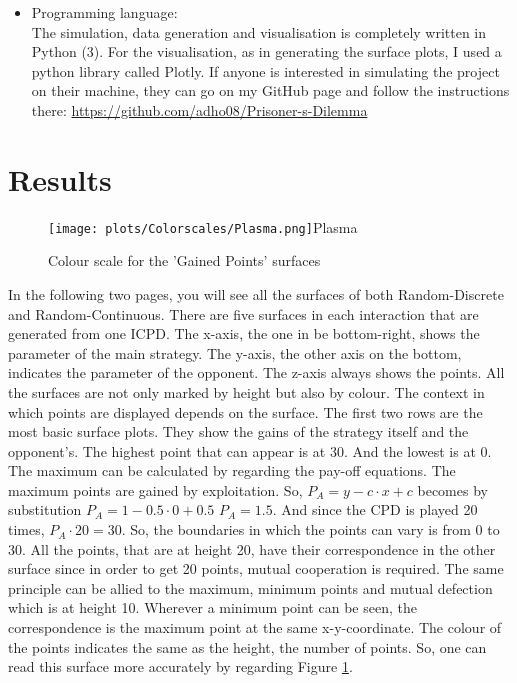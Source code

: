 \documentclass{article}
\begin{document}
\begin{itemize}
	\item Programming language:\\

The simulation, data generation and visualisation is completely written in Python (3).
For the visualisation, as in generating the surface plots, I used a python library called Plotly.
If anyone is interested in simulating the project on their machine, they can go on my GitHub page and follow the instructions there:
\href{https://github.com/adho08/Prisoner-s-Dilemma}{https://github.com/adho08/Prisoner-s-Dilemma}

	
\end{itemize}

\section{Results}

\begin{figure}
\texttt{[image: plots/Colorscales/Plasma.png]}{Plasma}
\caption{Colour scale for the 'Gained Points' surfaces}
\label{fig:Plasma}
\end{figure}
In the following two pages, you will see all the surfaces of both Random-Discrete and Random-Continuous.
There are five surfaces in each interaction that are generated from one ICPD.
The x-axis, the one in be bottom-right, shows the parameter of the main strategy.
The y-axis, the other axis on the bottom, indicates the parameter of the opponent.
The z-axis always shows the points.
All the surfaces are not only marked by height but also by colour.
The context in which points are displayed depends on the surface. 
The first two rows are the most basic surface plots.
They show the gains of the strategy itself and the opponent's.
The highest point that can appear is at 30.
And the lowest is at 0.
The maximum can be calculated by regarding the pay-off equations.
The maximum points are gained by exploitation.
So, $P_A =  y - c \cdot x + c$ becomes by substitution $P_A = 1 - 0.5 \cdot 0 + 0.5$ \textrightarrow $P_A = 1.5$.
And since the CPD is played 20 times, $P_A \cdot 20 = 30$.
So, the boundaries in which the points can vary is from 0 to 30.
All the points, that are at height 20, have their correspondence in the other surface since in order to get 20 points, mutual cooperation is required.
The same principle can be allied to the maximum, minimum points and mutual defection which is at height 10.
Wherever a minimum point can be seen, the correspondence is the maximum point at the same x-y-coordinate.
The colour of the points indicates the same as the height, the number of points.
So, one can read this surface more accurately by regarding Figure \ref{fig:Plasma}.
\end{document}
